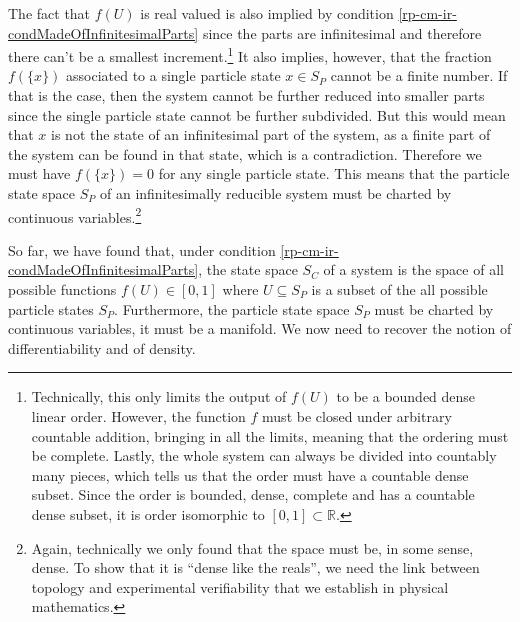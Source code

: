 The fact that $f(U)$ is real valued is also implied by condition \ref{rp-cm-ir-condMadeOfInfinitesimalParts} since the parts are infinitesimal and therefore there can't be a smallest increment.\footnote{Technically, this only limits the output of $f(U)$ to be a bounded dense linear order. However, the function $f$ must be closed under arbitrary countable addition, bringing in all the limits, meaning that the ordering must be complete. Lastly, the whole system can always be divided into countably many pieces, which tells us that the order must have a countable dense subset. Since the order is bounded, dense, complete and has a countable dense subset, it is order isomorphic to $[0, 1] \subset \mathbb{R}$.} It also implies, however, that the fraction $f(\{x\})$ associated to a single particle state $x \in S_P$ cannot be a finite number. If that is the case, then the system cannot be further reduced into smaller parts since the single particle state cannot be further subdivided. But this would mean that $x$ is not the state of an infinitesimal part of the system, as a finite part of the system can be found in that state, which is a contradiction. Therefore we must have $f(\{x\}) = 0$ for any single particle state. This means that the particle state space $S_P$ of an infinitesimally reducible system must be charted by continuous variables.\footnote{Again, technically we only found that the space must be, in some sense, dense. To show that it is ``dense like the reals'', we need the link between topology and experimental verifiability that we establish in physical mathematics.}

So far, we have found that, under condition \ref{rp-cm-ir-condMadeOfInfinitesimalParts}, the state space $S_C$ of a system is the space of all possible functions $f(U) \in [0,1]$ where $U \subseteq S_P$ is a subset of the all possible particle states $S_P$. Furthermore, the particle state space $S_P$ must be charted by continuous variables, it must be a manifold. We now need to recover the notion of differentiability and of density.

